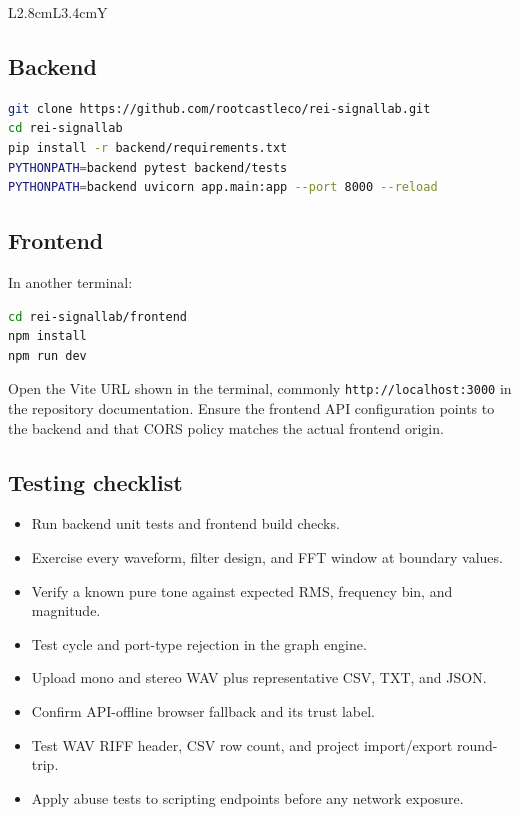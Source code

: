 \documentclass[10pt,a4paper]{article}
\newcommand{\code}[1]{\nolinkurl{#1}}
\begin{document}
\begin{tabularx}{\textwidth}{L{2.8cm}L{3.4cm}Y}
\subsection{Backend}

\begin{lstlisting}[language=bash]
git clone https://github.com/rootcastleco/rei-signallab.git
cd rei-signallab
pip install -r backend/requirements.txt
PYTHONPATH=backend pytest backend/tests
PYTHONPATH=backend uvicorn app.main:app --port 8000 --reload
\end{lstlisting}

\subsection{Frontend}

In another terminal:

\begin{lstlisting}[language=bash]
cd rei-signallab/frontend
npm install
npm run dev
\end{lstlisting}

Open the Vite URL shown in the terminal, commonly \code{http://localhost:3000} in the repository documentation. Ensure the frontend API configuration points to the backend and that CORS policy matches the actual frontend origin.

\subsection{Testing checklist}

\begin{itemize}
  \item Run backend unit tests and frontend build checks.
  \item Exercise every waveform, filter design, and FFT window at boundary values.
  \item Verify a known pure tone against expected RMS, frequency bin, and magnitude.
  \item Test cycle and port-type rejection in the graph engine.
  \item Upload mono and stereo WAV plus representative CSV, TXT, and JSON.
  \item Confirm API-offline browser fallback and its trust label.
  \item Test WAV RIFF header, CSV row count, and project import/export round-trip.
  \item Apply abuse tests to scripting endpoints before any network exposure.
\end{itemize}


\end{tabularx}
\end{document}

